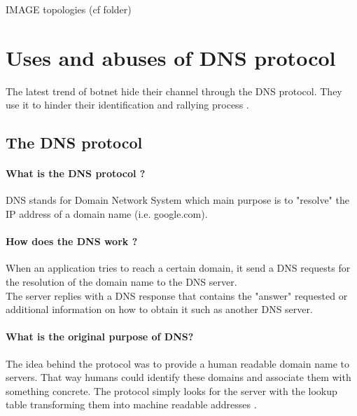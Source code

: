 IMAGE topologies (cf folder)

\newpage

\cite{phoenix}
\section{Uses and abuses of DNS protocol}
The latest trend of botnet hide their channel through the DNS protocol. They use it to hinder their identification and rallying process \cite{survey2}.\\

\subsection{The DNS protocol}
\paragraph{What is the DNS protocol ?}
DNS stands for Domain Network System which main purpose is to "resolve" the IP address of a domain name (i.e. google.com).\\

\paragraph{How does the DNS work ?}
When an application tries to reach a certain domain, it send a DNS requests for the resolution of the domain name to the DNS server. \\
The server replies with a DNS response that contains the "answer" requested or additional information on how to obtain it such as another DNS server.\\

\paragraph{What is the original purpose of DNS?}
The idea behind the protocol was to provide a human readable domain name to servers. That way humans could identify these domains and associate them with something concrete. The protocol simply looks for the server with the lookup table transforming them into machine readable addresses \cite{dns1}.


